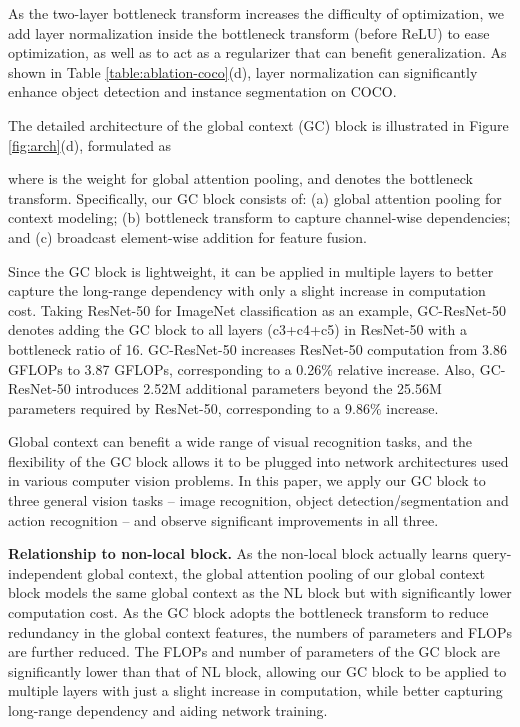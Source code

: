 \documentclass[10pt,twocolumn,letterpaper]{article}
\begin{document}
As the two-layer bottleneck transform increases the difficulty of optimization, we add layer normalization inside the bottleneck transform (before ReLU) to ease optimization, as well as to act as a regularizer that can benefit generalization.
As shown in Table \ref{table:ablation-coco}(d), layer normalization can significantly enhance object detection and instance segmentation on COCO.

The detailed architecture of the global context (GC) block is illustrated in Figure \ref{fig:arch}(d), formulated as

where  is the weight for global attention pooling, and  denotes the bottleneck transform.
Specifically, our GC block consists of: (a) global attention pooling for context modeling; (b) bottleneck transform  to capture channel-wise dependencies; and (c) broadcast element-wise addition for feature fusion.

Since the GC block is lightweight, it can be applied in multiple layers to better capture the long-range dependency with only a slight increase in computation cost. Taking ResNet-50 for ImageNet classification as an example, GC-ResNet-50 denotes adding the GC block to all layers (c3+c4+c5) in ResNet-50 with a bottleneck ratio of 16. GC-ResNet-50 increases ResNet-50 computation from 3.86 GFLOPs to 3.87 GFLOPs, corresponding to a 0.26\% relative increase.
Also, GC-ResNet-50 introduces 2.52M additional parameters beyond the 25.56M parameters required by ResNet-50, corresponding to a 9.86\% increase.

Global context can benefit a wide range of visual recognition tasks, and the flexibility of the GC block allows it to be plugged into network architectures used in various computer vision problems. In this paper, we apply our GC block to three general vision tasks -- image recognition, object detection/segmentation and action recognition -- and observe significant improvements in all three.


\textbf{Relationship to non-local block.}
As the non-local block actually learns query-independent global context, the global attention pooling of our global context block models the same global context as the NL block but with significantly lower computation cost.
As the GC block adopts the bottleneck transform to reduce redundancy in the global context features, the numbers of parameters and FLOPs are further reduced.
The FLOPs and number of parameters of the GC block are significantly lower than that of NL block, allowing our GC block to be applied to multiple layers with just a slight increase in computation, while better capturing long-range dependency and aiding network training.
\end{document}
